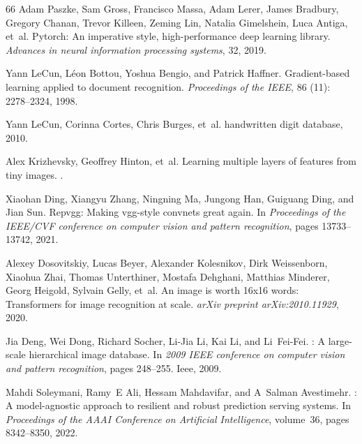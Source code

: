 \documentclass{article}
\begin{document}
\begin{thebibliography}{66}
Adam Paszke, Sam Gross, Francisco Massa, Adam Lerer, James Bradbury, Gregory Chanan, Trevor Killeen, Zeming Lin, Natalia Gimelshein, Luca Antiga, et~al.
\newblock Pytorch: An imperative style, high-performance deep learning library.
\newblock \emph{Advances in neural information processing systems}, 32, 2019.

Yann LeCun, L{\'e}on Bottou, Yoshua Bengio, and Patrick Haffner.
\newblock Gradient-based learning applied to document recognition.
\newblock \emph{Proceedings of the IEEE}, 86 (11): 2278--2324, 1998.

Yann LeCun, Corinna Cortes, Chris Burges, et~al.
 handwritten digit database, 2010.

Alex Krizhevsky, Geoffrey Hinton, et~al.
\newblock Learning multiple layers of features from tiny images.
.

Xiaohan Ding, Xiangyu Zhang, Ningning Ma, Jungong Han, Guiguang Ding, and Jian Sun.
\newblock Repvgg: Making vgg-style convnets great again.
\newblock In \emph{Proceedings of the IEEE/CVF conference on computer vision and pattern recognition}, pages 13733--13742, 2021.

Alexey Dosovitskiy, Lucas Beyer, Alexander Kolesnikov, Dirk Weissenborn, Xiaohua Zhai, Thomas Unterthiner, Mostafa Dehghani, Matthias Minderer, Georg Heigold, Sylvain Gelly, et~al.
\newblock An image is worth 16x16 words: Transformers for image recognition at scale.
\newblock \emph{arXiv preprint arXiv:2010.11929}, 2020.

Jia Deng, Wei Dong, Richard Socher, Li-Jia Li, Kai Li, and Li~Fei-Fei.
: A large-scale hierarchical image database.
\newblock In \emph{2009 IEEE conference on computer vision and pattern recognition}, pages 248--255. Ieee, 2009.

Mahdi Soleymani, Ramy~E Ali, Hessam Mahdavifar, and A~Salman Avestimehr.
: A model-agnostic approach to resilient and robust prediction serving systems.
\newblock In \emph{Proceedings of the AAAI Conference on Artificial Intelligence}, volume~36, pages 8342--8350, 2022.


\end{thebibliography}
\end{document}
